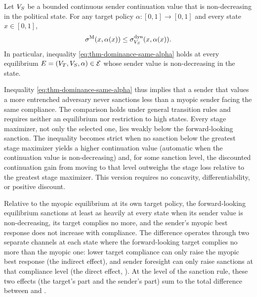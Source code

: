 \begin{theorem}
\label{thm:dominance}
Let $V_S$ be a bounded continuous sender continuation value that is non-decreasing in
the political state. For any target policy $\alpha\colon[0,1]\to[0,1]$ and every state
$x\in[0,1]$,
\begin{equation}
\sigma^{\mathrm{M}}(x,\alpha(x))
\le
\sigma^{\mathrm{dyn}}_{V_S}(x,\alpha(x)).
\label{eq:thm-dominance-same-alpha}
\end{equation}
In particular, inequality \eqref{eq:thm-dominance-same-alpha} holds at every
equilibrium $E=(V_T,V_S,\alpha)\in\mathcal E$ whose sender value is non-decreasing in
the state.
\end{theorem}

 Inequality
\eqref{eq:thm-dominance-same-alpha} thus implies that a sender that values a more
entrenched adversary never sanctions less than a myopic sender facing the same
compliance. The comparison holds under general
transition rules and requires neither an equilibrium nor restriction to high states.
Every stage maximizer, not only the selected one, lies weakly below the forward-looking
sanction. The inequality becomes strict when no sanction below the greatest stage
maximizer yields a higher continuation value (automatic when the continuation value is
non-decreasing) and, for some sanction level, the discounted continuation gain from
moving to that level outweighs the stage loss relative to the greatest stage
maximizer. This version requires no concavity, differentiability, or positive
discount.

Relative to the myopic equilibrium at its own target policy, the forward-looking
equilibrium sanctions at least as heavily at every state when its sender value is
non-decreasing, its target complies no more, and the sender's myopic best response does
not increase with compliance. The difference operates through two separate channels at
each state where the forward-looking target complies no more than the myopic one: lower
target compliance can only raise the myopic best response (the indirect effect), and
sender foresight can only raise sanctions at that compliance level (the direct effect,
). At the level of the sanction rule, these two effects (the
target's part and the sender's part) sum to the total difference between
 and .

